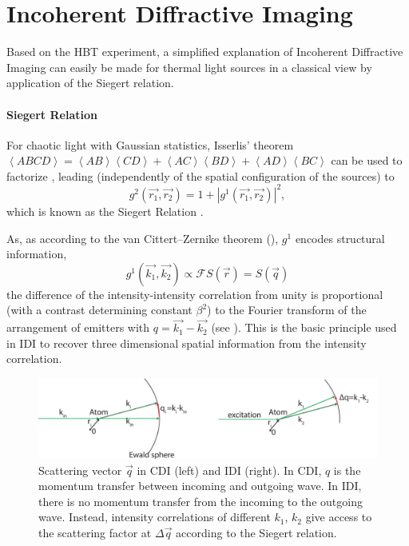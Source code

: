 \section{Incoherent Diffractive Imaging}
Based on the HBT experiment, a simplified explanation of Incoherent Diffractive Imaging can easily be made for thermal light sources in a classical view by application of the Siegert relation.

\paragraph{Siegert Relation}
For chaotic light with Gaussian statistics, Isserlis' theorem 
$\left<ABCD\right>=\left<AB\right>\left<CD\right>+\left<AC\right>\left<BD\right>+\left<AD\right>\left<BC\right>$ can be used to factorize , leading (independently of the spatial configuration of the sources) to
\begin{equation}
	g^2(\vec{r_1},\vec{r_2}) = 1+ |g^1(\vec{r_1},\vec{r_2}) |^2 ,
\end{equation}
which is known as the Siegert Relation \cite{ou2017}. 

As, as according to the van Cittert–Zernike theorem (), $g^1$ encodes structural information, 
\begin{equation}
	g^1(\vec{k_1},\vec{k_2}) \propto \mathscr{F}S(\vec{r}) = S(\vec{q})
\end{equation}
the difference of the intensity-intensity correlation from unity is proportional (with a contrast determining constant $\beta^2$) to the Fourier transform of the arrangement of emitters with $q=\vec{k_1}-\vec{k_2}$ (see ).
This is the basic principle used in IDI to recover three dimensional spatial information from the intensity correlation.
\begin{figure}
	\centering
	\includegraphics[width=0.9\linewidth]{images/scatteringvectors.pdf}
	\caption[Scattering vectors]{Scattering vector $\vec{q}$ in CDI (left) and IDI (right). In CDI, $q$ is the momentum transfer between incoming and outgoing wave. In IDI, there is no momentum transfer from the incoming to the outgoing wave. Instead, intensity correlations of different $k_1$, $k_2$ give access to the scattering factor at $\Delta\vec{q}$ according to the Siegert relation.}
	\label{fig:scatteringvectors}
	
\end{figure}


